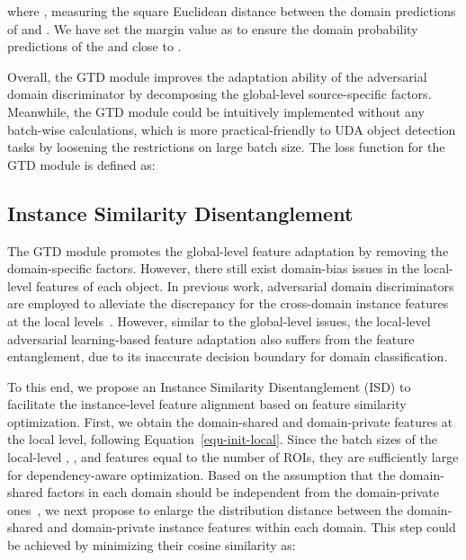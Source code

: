 \documentclass[journal]{IEEEtran}
\begin{document}
where , measuring the square Euclidean distance between the  domain predictions of  and . We have set the margin value  as  to ensure the domain probability predictions of the  and  close to . {}


Overall, the GTD module improves the adaptation ability of the adversarial domain discriminator by decomposing the global-level source-specific factors. Meanwhile, the GTD module could be intuitively implemented without any batch-wise calculations, which is more practical-friendly to UDA object detection tasks by loosening the restrictions on large batch size. The loss function for the GTD module is defined as:





\subsection{Instance Similarity Disentanglement}

The GTD module promotes the global-level feature adaptation by removing the domain-specific factors. However, there still exist domain-bias issues in the local-level features of each object. In previous work, adversarial domain discriminators are employed to alleviate the discrepancy for the cross-domain instance features at the local levels~\cite{chen2018domain,he2019multi}. However, similar to the global-level issues, the local-level adversarial learning-based feature adaptation also suffers from the feature entanglement, due to its inaccurate decision boundary for domain classification. 

To this end, we propose an Instance Similarity Disentanglement (ISD) to facilitate the instance-level feature alignment based on feature similarity optimization. First, we obtain the domain-shared and domain-private features at the local level, following Equation~\ref{equ-init-local}. Since the batch sizes of the local-level , ,  and  features equal to the number of ROIs, they are sufficiently large for dependency-aware optimization. Based on the assumption that the domain-shared factors in each domain should be independent from the domain-private ones~\cite{bousmalis2016domain,cai2019learning,peng2019domain}, we next propose to enlarge the distribution distance between the domain-shared and domain-private instance features within each domain. This step could be achieved by minimizing their cosine similarity as:
\end{document}
